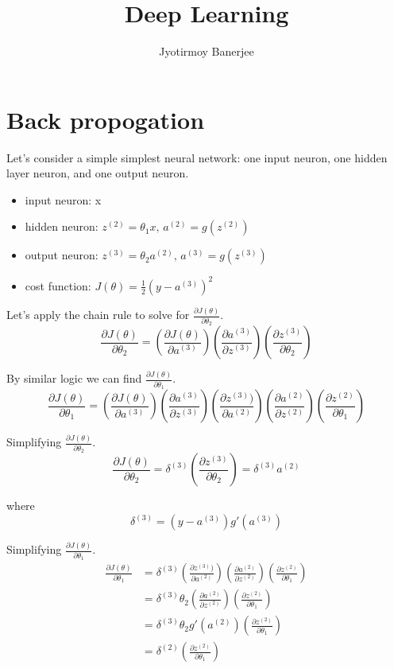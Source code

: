 \documentclass{article}
\title{Deep Learning}
\author{Jyotirmoy Banerjee}
\begin{document}
\maketitle


\section{Back propogation}

Let's consider a simple simplest neural network: one input neuron, one hidden layer neuron, and one output neuron.
\begin{itemize}
\item input neuron: x 
\item hidden neuron: $z^{(2)} = \theta_1 x, \, a^{(2)} = g(z^{(2)})$
\item output neuron:  $z^{(3)} = \theta_2 a^{(2)},  \, a^{(3)} = g(z^{(3)})$
\item cost function: $J(\theta) = \frac{1}{2} (y - a^{(3)})^2$
\end{itemize}


Let's apply the chain rule to solve for $\frac{\partial J(\theta)}{\partial \theta_2}$.
\[
\frac{\partial J(\theta)}{\partial \theta_2}
=  \left( \frac{\partial J(\theta)}{\partial a^{(3)}} \right) \left(  \frac{\partial a^{(3)}}{\partial z^{(3)}} \right) \left(  \frac{\partial z^{(3)}}{\partial \theta_2} \right) 
\]

By similar logic we can find $\frac{\partial J(\theta)}{\partial \theta_1}$.
\[
\frac{\partial J(\theta)}{\partial \theta_1}
 =  \left( \frac{\partial J(\theta)}{\partial a^{(3)}} \right) \left(  \frac{\partial a^{(3)}}{\partial z^{(3)}} \right) \left( \frac{\partial z^{(3)})}{\partial a^{(2)}} \right) \left(  \frac{\partial a^{(2)}}{\partial z^{(2)}} \right) \left(  \frac{\partial z^{(2)}}{\partial \theta_1} \right) 
\]

 
Simplifying $\frac{\partial J(\theta)}{\partial \theta_2}$.
\[
\frac{\partial J(\theta)}{\partial \theta_2}
=  \delta^{(3)}  \left(  \frac{\partial z^{(3)}}{\partial \theta_2} \right)
=  \delta^{(3)} a^{(2)}
\]

where \[ \delta^{(3)} = (y - a^{(3)}) g'(a^{(3)})\]

Simplifying $\frac{\partial J(\theta)}{\partial \theta_1}$.
\begin{align}
\frac{\partial J(\theta)}{\partial \theta_1}
& =  \delta^{(3)} \left( \frac{\partial z^{(3)})}{\partial a^{(2)}} \right) \left(  \frac{\partial a^{(2)}}{\partial z^{(2)}} \right) \left(  \frac{\partial z^{(2)}}{\partial \theta_1} \right) \nonumber \\
& =  \delta^{(3)} \theta_2 \left(  \frac{\partial a^{(2)}}{\partial z^{(2)}} \right) \left(  \frac{\partial z^{(2)}}{\partial \theta_1} \right) \nonumber \\
& =  \delta^{(3)} \theta_2 g'(a^{(2)})  \left(  \frac{\partial z^{(2)}}{\partial \theta_1} \right) \nonumber \\
& =  \delta^{(2)}  \left(  \frac{\partial z^{(2)}}{\partial \theta_1} \right) \nonumber
\end{align}
\end{document}

